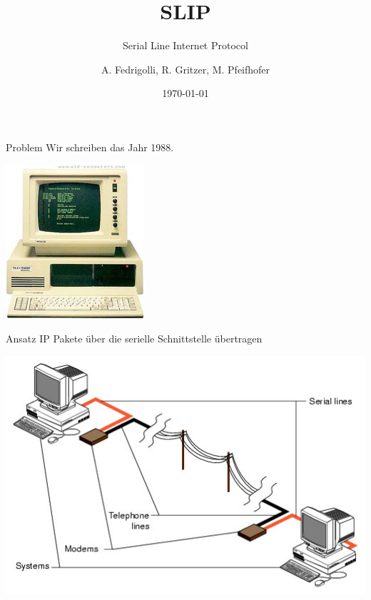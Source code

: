 \documentclass[beamer]{uibk}
\title{SLIP}
\subtitle{Serial Line Internet Protocol}
\author{A. Fedrigolli, R. Gritzer, M. Pfeifhofer }
\date{\today}
\begin{document}
\maketitle

\begin{frame}{Problem}
  Wir schreiben das Jahr 1988.

  \includegraphics[scale=0.5]{1988computer.jpg}

\end{frame}

\begin{frame}{Ansatz}
  IP Pakete über die serielle Schnittstelle  übertragen
  \begin{center}
  \includegraphics[scale=0.5]{ansatz.jpg}
  \end{center}
\end{frame}
\end{document}
